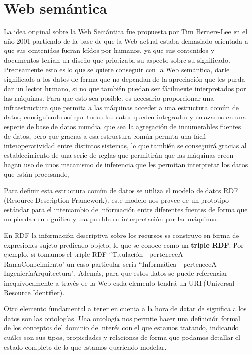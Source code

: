 \section{Web semántica}
La idea original sobre la Web Semántica fue propuesta por {\sf Tim Berners-Lee} en el año 2001 partiendo de la base de que {\sf la Web actual} estaba demasiado orientada a que sus contenidos fueran leídos por humanos, ya que sus contenidos y documentos tenían un diseño que priorizaba su aspecto sobre su significado. Precisamente esto es lo que se quiere conseguir con {\sf la Web semántica}, darle significado a los datos de forma que no dependan de la apreciación que les pueda dar un lector humano, si no que también puedan ser fácilmente interpretados por las máquinas. Para que esto sea posible, es necesario proporcionar una infraestructura que permita a las máquinas acceder a una estructura común de datos, consiguiendo así que todos los datos queden integrados y enlazados en una especie de base de datos mundial que sea la agregación de innumerables fuentes de datos, pero que gracias a esa estructura común permita una fácil interoperatividad entre distintos sistemas, lo que también se conseguirá gracias al establecimiento de una serie de reglas que permitirán que las máquinas creen hagan uso de unos mecanismo de inferencia que les permitan interpretar los datos que están procesando, 

\bigskip
Para definir esta estructura común de datos se utiliza el modelo de datos {\sf RDF (Resource Description Framework)}, este modelo nos provee de un prototipo estándar para el intercambio de información entre diferentes fuentes de forma que no pierdan su significa y sea posible su interpretación por las máquinas. 

\bigskip En {\sf RDF} la información descriptiva sobre los recursos se construyo en forma de expresiones sujeto-predicado-objeto, lo que se conoce como un \textbf{triple RDF}. Por ejemplo, si tomamos el triple RDF ``Titulación - perteneceA - RamaConocimiento" un caso particular sería ``Informática - perteneceA - IngenieríaArquitectura". Además, para que estos datos se puede referenciar inequívocamente a través de la Web cada elemento tendrá un {\sf URI (Universal Resource Identifier)}.

\bigskip

Otro elemento fundamental a tener en cuenta a la hora de dotar de significa a los datos son las ontologías. Una ontología nos permite hacer una definición formal de los conceptos del dominio de interés con el que estamos tratando, indicando cuáles son sus tipos, propiedades y relaciones de forma que podamos detallar el estado completo de lo que estamos queriendo modelar.

